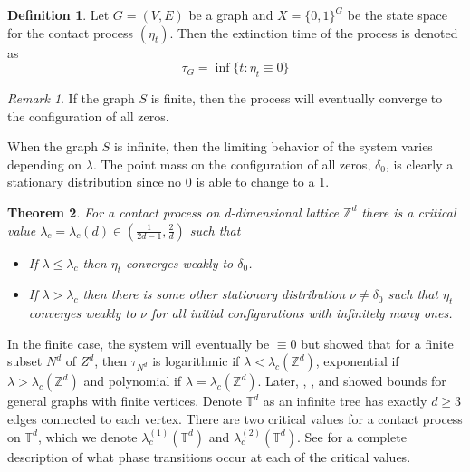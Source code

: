 \documentclass{article}
\theoremstyle{plain}
\newtheorem{theorem}{Theorem}[section]
\theoremstyle{definition}
\newtheorem{defn}[theorem]{Definition}
\theoremstyle{remark}
\newtheorem*{remark}{Remark}
\numberwithin{equation}{section}
\newcommand{\Z}{\mathbb{Z}}
\begin{document}
\begin{defn}
Let $G = (V,E)$ be a graph and $X = \{0,1\}^G$ be the state space for the contact process $(\eta_t)$.
Then the extinction time of the process is denoted as
$$
\tau_{G} = \inf\{ t : \eta_t \equiv 0 \}
$$
\end{defn}

\begin{remark}
If the graph $S$ is finite, then the process will eventually converge to the configuration of all zeros.
\end{remark}

When the graph $S$ is infinite, then the limiting behavior of the system varies depending on $\lambda$.
The point mass on the configuration of all zeros, $\delta_0$, is clearly a stationary distribution since no 0 is able to change to a 1.

\begin{theorem} \cite{Liggett2002}
For a contact process on d-dimensional lattice $\Z^d$ there is a critical value $\lambda_c = \lambda_c(d) \in \left( \frac{1}{2d - 1}, \frac{2}{d} \right)$ such that
\begin{itemize}
    \item If $\lambda \leq \lambda_c$ then $\eta_t$ converges weakly to $\delta_0$. %
    \item If $\lambda > \lambda_c$ then there is some other stationary distribution $\nu \not = \delta_0$ such that $\eta_t$ converges weakly to $\nu$ for all initial configurations with infinitely many ones.
\end{itemize}
\end{theorem}

In the finite case, the system will eventually be $\equiv 0$ but \cite{Liggett1999} showed that for a finite subset $N^d$ of $Z^d$, then $\tau_{N^d}$ is logarithmic if $\lambda < \lambda_c(\Z^d)$, exponential if $\lambda > \lambda_c(\Z^d)$ and polynomial if $\lambda = \lambda_c(\Z^d)$.
Later, \cite{schapira2017}, \cite{mourrat2014phase}, and \cite{Mountford2016} showed bounds for general graphs with finite vertices.
Denote $\mathbb T^d$ as an infinite tree has exactly $d \geq 3$ edges connected to each vertex.
There are two critical values for a contact process on $\mathbb T^d$, which we denote $\lambda_c^{(1)}(\mathbb T^d)$ and $\lambda_c^{(2)}(\mathbb T^d)$.
See \cite{mourrat2014phase} for a complete description of what phase transitions occur at each of the critical values.
\end{document}

